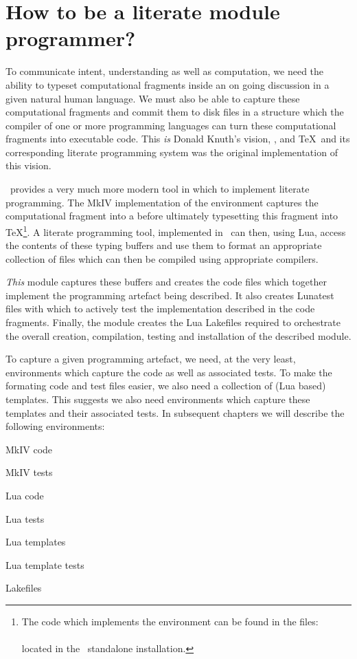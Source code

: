 \section{How to be a literate module programmer?} 

To communicate intent, understanding as well as computation, we need the 
ability to typeset computational fragments inside an on going discussion 
in a given natural human language. We must also be able to capture these 
computational fragments and commit them to disk files in a structure which 
the compiler of one or more programming languages can turn these 
computational fragments into executable code. This \emph{is} Donald 
Knuth's vision, \cite{knuth1984literateProgramming}, and \TeX\ and its 
corresponding  literate programming system was the original 
implementation of this vision. 

\ConTeXt\ provides a very much more modern tool in which to implement 
literate programming. The MkIV implementation of the  
environment captures the computational fragment into a  
before ultimately typesetting this fragment into \TeX\footnote{The code 
which implements the  environment can be found in the 
files:\\ 
\\ 
located in the \ConTeXt\ standalone installation.}. A literate programming 
tool, implemented in \ConTeXt\, can then, using Lua, access the contents 
of these typing buffers and use them to format an appropriate collection 
of files which can then be compiled using appropriate compilers. 

\emph{This}  module captures these buffers and 
creates the code files which together implement the programming artefact 
being described. It also creates Lunatest files with which to actively 
test the implementation described in the code fragments. Finally, the 
 module creates the Lua Lakefiles required to 
orchestrate the overall creation, compilation, testing and installation of 
the described module. 

To capture a given programming artefact, we need, at the very least, 
 environments which capture the code as well as associated 
tests. To make the formating code and test files easier, we also need a 
collection of (Lua based) templates. This suggests we also need 
 environments which capture these templates and their 
associated tests. In subsequent chapters we will describe the following 
environments:


\startitemize
  \item MkIV code
  \item MkIV tests
  \item Lua code
  \item Lua tests
  \item Lua templates
  \item Lua template tests
  \item Lakefiles
\stopitemize 

\stopchapter 

